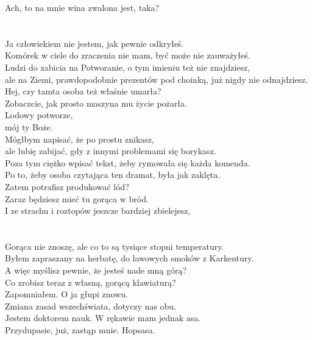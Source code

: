\chardok{}
Ach, to na mnie wina zwalona jest, taka?\\
\\

\\

\charmik{}
Ja człowiekiem nie jestem, jak pewnie odkryłeś.\\
Komórek w ciele do zraczenia nie mam, być może nie zauważyłeś.\\
Ludzi do zabicia na Potworanie, o tym imieniu też nie znajdziesz,\\
ale na Ziemi, prawdopodobnie prezentów pod choinką, już nigdy nie odnajdziesz.\\
Hej, czy tamta osoba też właśnie umarła?\\
Zobaczcie, jak prosto maszyna mu życie pożarła.\\

\chardok{}
Lodowy potworze,\\
mój ty Boże.\\
Mógłbym napisać, że po prostu znikasz, \\
ale lubię zabijać, gdy z innymi problemami się borykasz.\\
Poza tym ciężko wpisać tekst, żeby rymowała się każda komenda.\\
Po to, żeby osoba czytająca ten dramat, była jak zaklęta.\\
Zatem potrafisz produkować lód?\\
Zaraz będziesz mieć tu gorąca w bród.\\
I ze strachu i roztopów jeszcze bardziej zbielejesz,\\
\\

\\

\charmik{}
Gorąca nie znoszę, ale co to są tysiące stopni temperatury.\\
Byłem zapraszany na herbatę, do lawowych smoków z Karkentury.\\
A więc myślisz pewnie, że jesteś nade mną górą?\\
Co zrobisz teraz z własną, gorącą klawiaturą?\\

\chardok{}
Zapomniałem. O ja głupi znowu.\\
Zmiana zasad wszechświata, dotyczy nas obu.\\
Jestem doktorem nauk. W rękawie mam jednak asa.\\
Przydupasie, już, zastąp mnie. Hopsasa.\\

